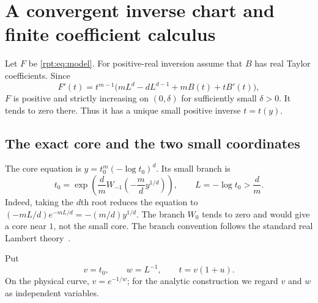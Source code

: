 \documentclass[11pt,a4paper]{article}
\numberwithin{equation}{section}
\theoremstyle{definition}\newtheorem{definition}[theorem]{Definition}
\theoremstyle{remark}\newtheorem{remark}[theorem]{Remark}
\begin{document}
\section{A convergent inverse chart and finite coefficient calculus}
\label{rpt:sec:inverse}

Let $F$ be \eqref{rpt:eq:model}. For positive-real inversion assume that $B$ has real Taylor coefficients. Since
\begin{equation}
F'(t)=t^{m-1}\bigl(mL^d-dL^{d-1}+mB(t)+tB'(t)\bigr),
\label{rpt:eq:Fprime}
\end{equation}
$F$ is positive and strictly increasing on $(0,\delta)$ for sufficiently small $\delta>0$. It tends to zero there. Thus it has a unique small positive inverse $t=t(y)$.

\subsection{The exact core and the two small coordinates}

The core equation is $y=t_0^m(-\log t_0)^d$. Its small branch is
\begin{equation}
t_0=\exp\left(\frac dm W_{-1}\left(-\frac md y^{1/d}\right)\right),
\qquad L=-\log t_0>\frac dm.
\label{rpt:eq:Wcore}
\end{equation}
Indeed, taking the $d$th root reduces the equation to $(-mL/d)e^{-mL/d}=-(m/d)y^{1/d}$. The branch $W_0$ tends to zero and would give a core near $1$, not the small core. The branch convention follows the standard real Lambert theory~\cite{dlmfw,corless}.

Put
\[
v=t_0,\qquad w=L^{-1},\qquad t=v(1+u).
\]
On the physical curve, $v=e^{-1/w}$; for the analytic construction we regard $v$ and $w$ as independent variables.
\end{document}
